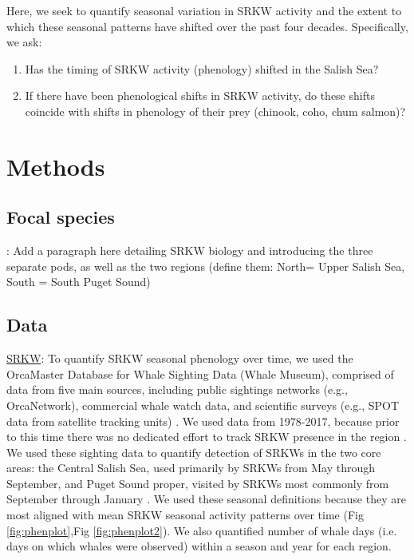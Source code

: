 \documentclass{article}
\begin{document}
\par Here, we seek to quantify seasonal variation in SRKW activity and the extent to which these seasonal patterns have shifted over the past four decades.  %
Specifically, we ask:
\begin{enumerate}
\item Has the timing of SRKW activity (phenology) shifted in the Salish Sea? 
\item If there have been phenological shifts in SRKW activity, do these shifts coincide with shifts in phenology of their prey (chinook, coho, chum salmon)?
\end{enumerate}

\section* {Methods}
\subsection*{Focal species}:
Add a paragraph here detailing SRKW biology and introducing the three separate pods, as well as the two regions (define them: North= Upper Salish Sea, South = South Puget Sound)

\subsection* {Data}
\par \underline{SRKW}: To quantify SRKW seasonal phenology over time, we used the OrcaMaster Database for Whale Sighting Data (Whale Museum), comprised of data from five main sources, including public sightings networks (e.g., OrcaNetwork), commercial whale watch data, and scientific surveys (e.g., SPOT data from satellite tracking units) \citep{olson2018}. We used data from 1978-2017, because prior to this time there was no dedicated effort to track SRKW presence in the region \citep{olson2018}. We used these sighting data to quantify %
detection of SRKWs in the two core areas: the Central Salish Sea, used primarily by SRKWs from May through September, and Puget Sound proper, visited by SRKWs most commonly from September through January \citep{olson2018}. We used these seasonal definitions because they are most aligned with mean SRKW seasonal activity patterns over time (Fig \ref{fig:phenplot},Fig \ref{fig:phenplot2}).  We also quantified number of whale days (i.e. days on which whales were observed) within a season and year for each region. 
\end{document}
